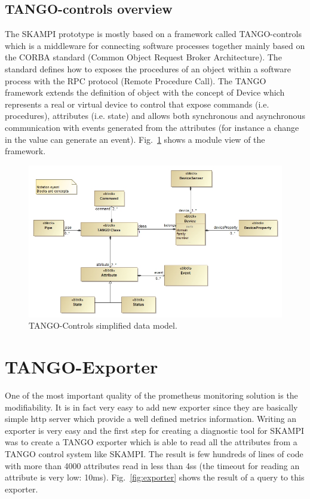 \documentclass[]{spie}  %
\begin{document}
\subsection{TANGO-controls overview}
The SKAMPI prototype is mostly based on a framework called TANGO-controls~\cite{tango-controls} which is a middleware for connecting software processes together mainly based on the CORBA standard (Common Object Request Broker Architecture). The standard defines how to exposes the procedures of an object within a software process with the RPC protocol (Remote Procedure Call). The TANGO framework extends the definition of object with the concept of Device which represents a real or virtual device to control that expose commands (i.e. procedures), attributes (i.e. state) and allows both synchronous and asynchronous communication with events generated from the attributes (for instance a change in the value can generate an event). Fig.~\ref{fig:tangodatamodel}  shows a module view of the framework.

\begin{figure}[!htb]
   \centering
   \includegraphics*[width=0.6\columnwidth]{SimplifiedDataModel}
   \caption{TANGO-Controls simplified data model.}
   \label{fig:tangodatamodel}
\end{figure}

\section{TANGO-Exporter}
One of the most important quality of the prometheus monitoring solution is the modifiability. It is in fact very easy to add new exporter since they are basically simple http server which provide a well defined metrics information. Writing an exporter is very easy and the first step for creating a diagnostic tool for SKAMPI was to create a TANGO exporter which is able to read all the attributes from a TANGO control system like SKAMPI. The result is few hundreds of lines of code with more than 4000 attributes read in less than 4ss (the timeout for reading an attribute is very low: 10ms). Fig.~\ref{fig:exporter} shows the result of a query to this exporter. 
\end{document}
